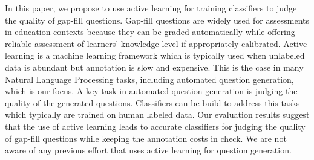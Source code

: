 In this paper, we propose to use active learning for training classifiers to judge the quality of gap-fill questions. Gap-fill questions are widely used for assessments in education contexts because they can be graded automatically while offering reliable assessment of learners' knowledge level if appropriately calibrated. Active learning is a machine learning framework which is typically used when unlabeled data is abundant but annotation is slow and expensive. This is the case in many Natural Language Processing tasks, including automated question generation, which is our focus. A key task in automated question generation is judging the quality of the generated questions. Classifiers can be build to address this tasks which typically are trained on human labeled data. Our evaluation results suggest that the use of active learning leads to accurate classifiers for judging the quality of gap-fill questions while keeping the annotation costs in check. We are not aware of any previous effort that uses active learning for question generation.
